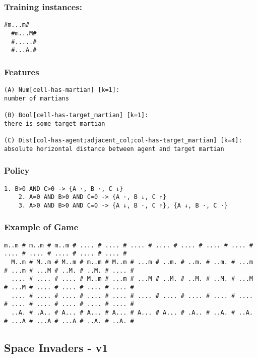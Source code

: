\documentclass[a4paper]{article}
\begin{document}
\subsubsection{Training instances:}
\begin{Verbatim}[fontsize=\footnotesize]
  #m...m#
  #m...M#
  #.....#
  #...A.#
\end{Verbatim}

\subsubsection{Features}
\begin{Verbatim}[fontsize=\footnotesize]
(A) Num[cell-has-martian] [k=1]:
number of martians

(B) Bool[cell-has-target_martian] [k=1]:
there is some target martian

(C) Dist[col-has-agent;adjacent_col;col-has-target_martian] [k=4]:
absolute horizontal distance between agent and target martian
\end{Verbatim}

\subsubsection{Policy}
\begin{Verbatim}[fontsize=\footnotesize]
    1. B>0 AND C>0 -> {A ·, B ·, C ↓}
    2. A=0 AND B>0 AND C=0 -> {A ·, B ↓, C ↑}
    3. A>0 AND B>0 AND C=0 -> {A ↓, B ·, C ↑}, {A ↓, B ·, C ·}
\end{Verbatim}

\subsubsection{Example of Game}
\begin{Verbatim}[fontsize=\footnotesize]
  m..m # m..m # m..m # .... # .... # .... # .... # .... # .... # .... # .... # .... # .... # .... # .... #
  M..m # M..m # M..m # m..m # M..m # ...m # ..m. # ..m. # ..m. # ...m # ...m # ...M # ..M. # ..M. # .... #
  .... # .... # .... # M..m # ...m # ...M # ..M. # ..M. # ..M. # ...M # ...M # .... # .... # .... # .... #
  .... # .... # .... # .... # .... # .... # .... # .... # .... # .... # .... # .... # .... # .... # .... #
  ..A. # .A.. # A... # A... # A... # A... # A... # .A.. # ..A. # ..A. # ...A # ...A # ...A # ..A. # ..A. #
\end{Verbatim}

\subsection{Space Invaders - v1}
\end{document}
